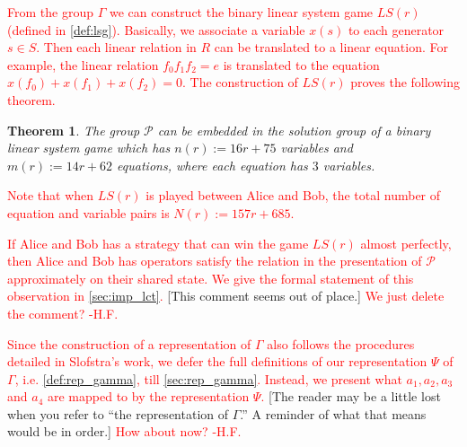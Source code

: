 \documentclass[11pt,letterpaper]{article}
\newcommand{\1}{\mathbb{1}}
\newcommand{\Pg}{\mathcal{P}}
\newcommand{\LS}{LS}
\def\carl#1{{\color{blue} #1}}
\newcommand{\hf}[1]{\textcolor{red}{#1}}
\newcommand{\hfc}[1]{\textcolor{red}{#1 -H.F.}}
\newtheorem{theorem}{Theorem}[section]
\theoremstyle{definition}
\begin{document}
\hf{From the group $\Gamma$ we can construct the binary linear system game $\LS(r)$ (defined in \cref{def:lsg}). Basically,
we associate a variable $x(s)$ to each generator $s \in S$.
Then each linear relation in $R$ can be translated to a linear equation.
For example, the linear relation $f_0f_1f_2 = e$ is translated to the equation $x(f_0) + x(f_1) + x(f_2) = 0$.
The construction of $\LS(r)$ proves the following theorem.}
\begin{theorem}
	The group $\Pg$ can be embedded in the solution group of a binary linear system game which has
	$n(r) := 16r+75$ variables and $m(r) := 14r + 62$ equations, where each equation has $3$ variables.
\end{theorem}
\hf{Note that when $\LS(r)$ is played between Alice and Bob, the total
number of equation and variable pairs is $N(r) := 157r + 685$.}

\hf{If Alice and Bob has a strategy that can win the game $\LS(r)$
almost perfectly, then Alice and Bob has operators satisfy the 
relation in the presentation of $\Pg$ approximately on their shared state. 
We give the formal statement of this observation in \cref{sec:imp_lct}. }
\carl{[This comment seems out of place.]}
\hfc{We just delete the comment?}

\hf{Since the construction of a representation of $\Gamma$ also follows the procedures detailed in Slofstra's work, 
we defer the full definitions 
of our representation $\Psi$ of $\Gamma$, i.e. \cref{def:rep_gamma}, till \cref{sec:rep_gamma}. 
Instead, we present what $a_1, a_2, a_3$ and $a_4$ are mapped to by the representation $\Psi$.
}  \carl{[The reader may be a little lost when you refer to ``the representation of $\Gamma$.''  A reminder of what that means would be in order.]}
\hfc{How about now?}
\end{document}
